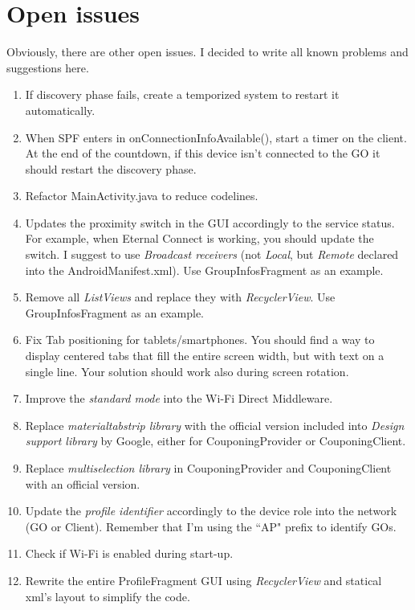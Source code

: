 \section*{Open issues}
Obviously, there are other open issues. I decided to write all known problems and suggestions here.
\begin{enumerate}
	\item If discovery phase fails, create a temporized system to restart it automatically.
	\item When SPF enters in \textsf{onConnectionInfoAvailable()}, start a timer on the client. At the end of the countdown, if this device isn't connected to the GO it should restart the discovery phase.
	\item Refactor \textsf{MainActivity.java} to reduce codelines.
	\item Updates the proximity switch in the GUI accordingly to the service status. For example, when Eternal Connect is working, you should update the switch. I suggest to use \emph{Broadcast receivers} (not \emph{Local}, but \emph{Remote} declared into the \textsf{AndroidManifest.xml}). Use \textsf{GroupInfosFragment} as an example.
	\item Remove all \emph{ListViews} and replace they with \emph{RecyclerView}. Use \textsf{GroupInfosFragment} as an example.
	\item Fix Tab positioning for tablets/smartphones. You should find a way to display centered tabs that fill the entire screen width, but with text on a single line. Your solution should work also during screen rotation.
	\item Improve the \emph{standard mode} into the Wi-Fi Direct Middleware.
	\item Replace \emph{materialtabstrip library} with the official version included into \emph{Design support library} by Google, either for \textsf{CouponingProvider} or \textsf{CouponingClient}.
	\item Replace \emph{multiselection library} in \textsf{CouponingProvider} and \textsf{CouponingClient} with an official version.
	\item Update the \emph{profile identifier} accordingly to the device role into the network (GO or Client). Remember that I'm using the ``AP" prefix to identify GOs.
	\item Check if Wi-Fi is enabled during start-up.
	\item Rewrite the entire \textsf{ProfileFragment} GUI using \emph{RecyclerView} and statical xml's layout to simplify the code.
\end{enumerate}